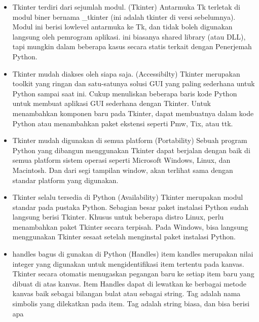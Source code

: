 \documentclass [12pt,a4paper,notitlepage,oneside,bahasa]{article}
\begin{document}
\begin{enumerate}
\begin{itemize}
\noindent 
\begin{itemize}
\item 
Tkinter terdiri dari sejumlah modul.  (Tkinter)\vspace{\baselineskip}
Antarmuka Tk terletak di modul biner
bernama _tkinter (ini adalah tkinter di versi sebelumnya). Modul ini berisi lowlevel
antarmuka ke Tk, dan tidak boleh digunakan langsung oleh pemrogram aplikasi. ini
biasanya shared library (atau DLL), tapi mungkin dalam beberapa kasus secara statis terkait dengan
Penerjemah Python. \par
\noindent
\item Tkinter mudah diakses oleh siapa saja. (Accessibilty)\vspace{\baselineskip}
Tkinter merupakan toolkit yang ringan dan satu-satunya solusi GUI yang paling sederhana untuk Python sampai saat ini. Cukup menuliskan 
beberapa baris kode Python untuk membuat aplikasi GUI sederhana dengan Tkinter. Untuk menambahkan komponen baru pada Tkinter, dapat 
membuatnya dalam kode Python atau menambahkan paket ekstensi seperti Pmw, Tix, atau ttk. \par
\noindent 
\item Tkinter mudah digunakan di semua platform (Portability)\vspace{\baselineskip}
Sebuah program Python yang dibangun menggunakan Tkinter dapat berjalan dengan baik di semua platform sistem operasi seperti Microsoft 
Windows, Linux, dan Macintosh. Dan dari segi tampilan window, akan terlihat sama dengan standar platform yang digunakan. \par
\noindent 
\item Tkinter selalu tersedia di Python (Availability)\vspace{\baselineskip}
Tkinter merupakan modul standar pada pustaka Python. Sebagian besar paket instalasi Python sudah langsung berisi Tkinter. Khusus untuk 
beberapa distro Linux, perlu menambahkan paket Tkinter secara terpisah. Pada Windows, bisa langsung menggunakan Tkinter sesaat setelah 
menginstal paket instalasi Python. \par
\noindent 
\item handles bagus di gunakan di Python (Handles)\vspace{\baselineskip}
item kandles merupakan nilai integer yang digunakan untuk mengidentifikasi item tertentu pada kanvas. Tkinter secara otomatis menugaskan 
pegangan baru ke setiap item baru yang dibuat di atas kanvas. Item Handles dapat di lewatkan ke berbagai metode kanvas baik sebagai 
bilangan bulat atau sebagai string. Tag adalah nama simbolis yang dilekatkan pada item. Tag adalah string biasa, dan bisa berisi apa 

\end{itemize}
\end{itemize}
\end{enumerate}
\end{document}

